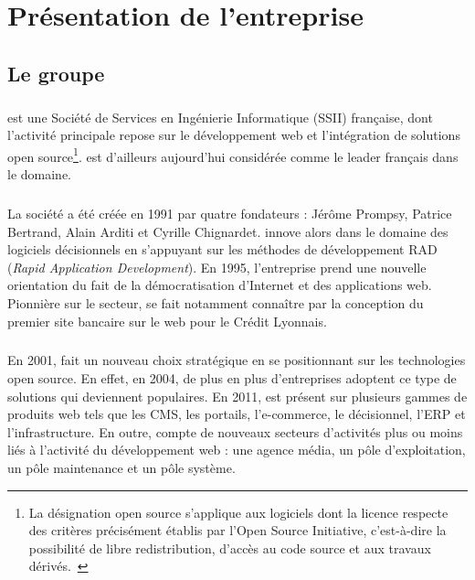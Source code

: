 \chapter{Présentation de l'entreprise}

\section{Le groupe \asmile}

\paragraph{}
\asmile{} est une Société de Services en Ingénierie Informatique (SSII) française, dont l'activité principale repose sur le développement web et l'intégration de solutions open source\footnote{La désignation open source s'applique aux logiciels dont la licence respecte des critères précisément établis par l'Open Source Initiative, c'est-à-dire la possibilité de libre redistribution, d'accès au code source et aux travaux dérivés.~\cite{opensource}}.
\asmile{} est d'ailleurs aujourd'hui considérée comme le leader français dans le domaine.

\paragraph{}
La société a été créée en 1991 par quatre fondateurs : Jérôme Prompsy, Patrice Bertrand, Alain Arditi et Cyrille Chignardet.
\asmile{} innove alors dans le domaine des logiciels décisionnels en s'appuyant sur les méthodes de développement RAD (\textit{Rapid Application Development}).
En 1995, l'entreprise prend une nouvelle orientation du fait de la démocratisation d'Internet et des applications web.
Pionnière sur le secteur, \asmile{} se fait notamment connaître par la conception du premier site bancaire sur le web pour le Crédit Lyonnais.

\paragraph{}
En 2001, \asmile{} fait un nouveau choix stratégique en se positionnant sur les technologies open source.
En effet, en 2004, de plus en plus d'entreprises adoptent ce type de solutions qui deviennent populaires.
En 2011, \asmile{} est présent sur plusieurs gammes de produits web tels que les CMS, les portails, l'e-commerce, le décisionnel, l'ERP et l'infrastructure.
En outre, \asmile{} compte de nouveaux secteurs d'activités plus ou moins liés à l'activité du développement web : une agence média, un pôle d'exploitation, un pôle maintenance et un pôle système.

